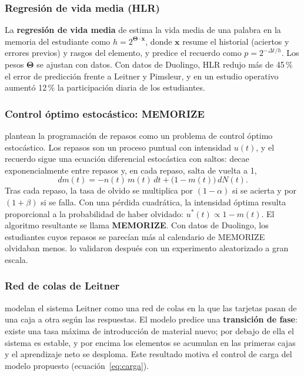 \documentclass[12pt]{article}
\theoremstyle{definition}
\begin{document}
\subsubsection{Regresión de vida media (HLR)}

La \textbf{regresión de vida media} de \citet{settles2016} estima la vida media de una palabra en la memoria del estudiante como $h=2^{\bm\Theta\cdot\mathbf x}$, donde $\mathbf x$ resume el historial (aciertos y errores previos) y rasgos del elemento, y predice el recuerdo como $p=2^{-\Delta t/h}$. Los pesos $\bm\Theta$ se ajustan con datos. Con datos de Duolingo, HLR redujo más de 45\,\% el error de predicción frente a Leitner y Pimsleur, y en un estudio operativo aumentó 12\,\% la participación diaria de los estudiantes.

\subsubsection{Control óptimo estocástico: MEMORIZE}

\citet{tabibian2019} plantean la programación de repasos como un problema de control óptimo estocástico. Los repasos son un proceso puntual con intensidad $u(t)$, y el recuerdo sigue una ecuación diferencial estocástica con saltos: decae exponencialmente entre repasos y, en cada repaso, salta de vuelta a 1,
\[
dm(t)=-n(t)\,m(t)\,dt+\bigl(1-m(t)\bigr)\,dN(t).
\]
Tras cada repaso, la tasa de olvido se multiplica por $(1-\alpha)$ si se acierta y por $(1+\beta)$ si se falla. Con una pérdida cuadrática, la intensidad óptima resulta proporcional a la probabilidad de haber olvidado: $u^\ast(t)\propto1-m(t)$. El algoritmo resultante se llama \textbf{MEMORIZE}. Con datos de Duolingo, los estudiantes cuyos repasos se parecían más al calendario de MEMORIZE olvidaban menos. \citet{upadhyay2021} lo validaron después con un experimento aleatorizado a gran escala.

\subsubsection{Red de colas de Leitner}

\citet{reddy2016} modelan el sistema Leitner como una red de colas en la que las tarjetas pasan de una caja a otra según las respuestas. El modelo predice una \textbf{transición de fase}: existe una tasa máxima de introducción de material nuevo; por debajo de ella el sistema es estable, y por encima los elementos se acumulan en las primeras cajas y el aprendizaje neto se desploma. Este resultado motiva el control de carga del modelo propuesto (ecuación~\ref{eq:carga}).
\end{document}
